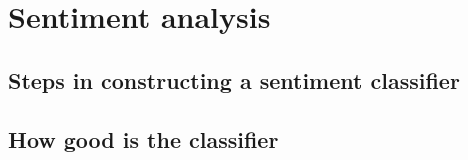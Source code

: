 \section{Sentiment analysis}

\subsection{Steps in constructing a sentiment classifier}


\subsection{How good is the classifier}